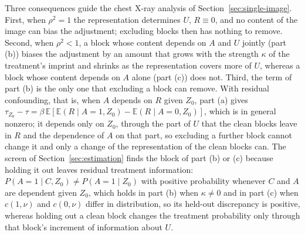 Three consequences guide the chest X-ray analysis of Section~\ref{sec:single-image}. First, when $\rho^2=1$ the representation determines $U$, $R\equiv0$, and no content of the image can bias the adjustment; excluding blocks then has nothing to remove. Second, when $\rho^2<1$, a block whose content depends on $A$ and $U$ jointly (part (b)) biases the adjustment by an amount that grows with the strength $\kappa$ of the treatment's imprint and shrinks as the representation covers more of $U$, whereas a block whose content depends on $A$ alone (part (c)) does not. Third, the term of part (b) is the only one that excluding a block can remove. With residual confounding, that is, when $A$ depends on $R$ given $Z_0$, part (a) gives $\tau_{Z_0}-\tau=\beta\,\mathbb E[\mathbb E(R\mid A=1,Z_0)-\mathbb E(R\mid A=0,Z_0)]$, which is in general nonzero; it depends only on $Z_0$, through the part of $U$ that the clean blocks leave in $R$ and the dependence of $A$ on that part, so excluding a further block cannot change it and only a change of the representation of the clean blocks can. The screen of Section~\ref{sec:estimation} finds the block of part (b) or (c) because holding it out leaves residual treatment information: $P(A=1\mid C,Z_0)\neq P(A=1\mid Z_0)$ with positive probability whenever $C$ and $A$ are dependent given $Z_0$, which holds in part (b) when $\kappa\neq0$ and in part (c) when $c(1,\nu)$ and $c(0,\nu)$ differ in distribution, so its held-out discrepancy is positive, whereas holding out a clean block changes the treatment probability only through that block's increment of information about $U$.
